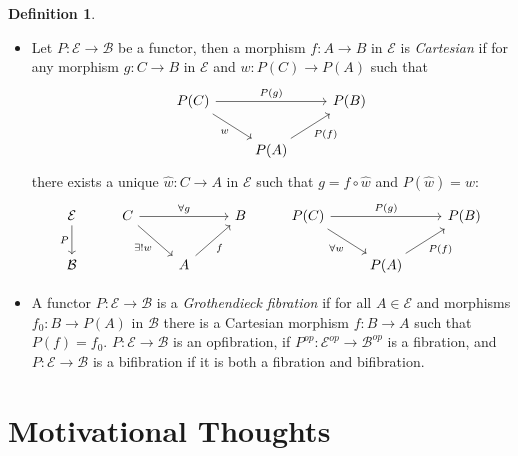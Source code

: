 \documentclass[8pt]{article}
\theoremstyle{definition}
\newtheorem{definition}{Definition}[section]
\theoremstyle{definition}
\theoremstyle{definition}
\theoremstyle{definition}
\theoremstyle{definition}
\theoremstyle{definition}
\theoremstyle{definition}
\theoremstyle{definition}
\theoremstyle{definition}
\theoremstyle{definition}
\theoremstyle{definition}
\theoremstyle{definition}
\theoremstyle{definition}
\theoremstyle{definition}
\theoremstyle{question}
\begin{document}
\begin{definition}
  $ $

  \begin{itemize}
    \item Let $P : \mathcal{E} \to \mathcal{B}$ be a functor, then a morphism $f : A \to B$ in $\mathcal{E}$
    is \emph{Cartesian} if for any morphism $g : C \to B$ in $\mathcal{E}$ and $w : P(C) \to P(A)$ such that
    \[
    \begin{tikzcd}
      P(C) \ar[rr, "P(g)"] \ar[dr, "w"'] && P(B) \\
      & P(A) \ar[ur, "P(f)"']
    \end{tikzcd}
    \]
    there exists a unique $\hat{w} : C \to A$ in $\mathcal{E}$ such that $g = f \circ \hat{w}$ and $P(\hat{w}) = w$:
    \[
    \begin{tikzcd}
      \mathcal{E} \ar[d, "P"'] & C \ar[dr, "\exists! w"'] \ar[rr, "\forall g"] && B & P(C) \ar[rr, "P(g)"] \ar[dr, "\forall w"'] && P(B) \\
      \mathcal{B}              && A \ar[ur, "f"']                                   &&& P(A) \ar[ur, "P(f)"']                    
    \end{tikzcd}
    \]
    \item A functor $P : \mathcal{E} \to \mathcal{B}$ is a \emph{Grothendieck fibration} if for all $A \in \mathcal{E}$
    and morphisms $f_0 : B \to P(A)$ in $\mathcal{B}$ there is a Cartesian morphism $f : B \to A$ such that $P(f) = f_0$.
    $P : \mathcal{E} \to \mathcal{B}$ is an opfibration, if $P^{op} : \mathcal{E}^{op} \to \mathcal{B}^{op}$
    is a fibration, and $P : \mathcal{E} \to \mathcal{B}$ is a bifibration if it is both a fibration and bifibration.
  \end{itemize}
\end{definition}

\section{Motivational Thoughts}
\end{document}
